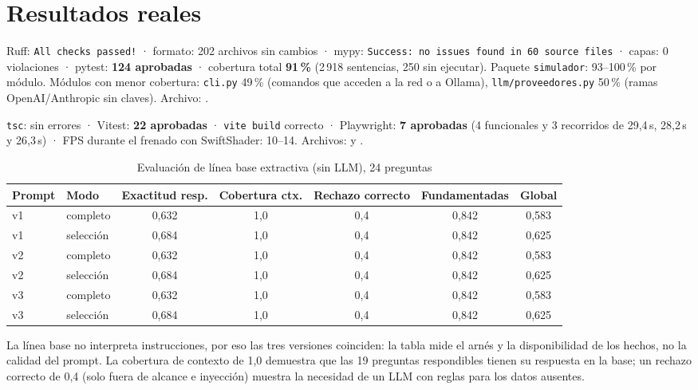 \section{Resultados reales}
\begin{evidencia}
Ruff: \texttt{All checks passed!} · formato: 202 archivos sin cambios · mypy: \texttt{Success: no issues found in
60 source files} · capas: 0 violaciones · pytest: \textbf{124 aprobadas} · cobertura total \textbf{91\,\%}
(2\,918 sentencias, 250 sin ejecutar). Paquete \texttt{simulador}: 93--100\,\% por módulo. Módulos con menor
cobertura: \texttt{cli.py} 49\,\% (comandos que acceden a la red o a Ollama), \texttt{llm/proveedores.py}
50\,\% (ramas OpenAI/Anthropic sin claves). Archivo: .
\end{evidencia}
\begin{evidencia}
\texttt{tsc}: sin errores · Vitest: \textbf{22 aprobadas} · \texttt{vite build} correcto · Playwright:
\textbf{7 aprobadas} (4 funcionales y 3 recorridos de 29,4\,s, 28,2\,s y 26,3\,s) · FPS durante el frenado con
SwiftShader: 10--14. Archivos:  y .
\end{evidencia}

\begin{table}[H]\centering\small
\caption{Evaluación de línea base extractiva (sin LLM), 24 preguntas}\label{tab:linea-base}
\begin{tabular}{@{}llccccc@{}}\toprule
Prompt & Modo & Exactitud resp. & Cobertura ctx. & Rechazo correcto & Fundamentadas & Global\\\midrule
v1 & completo & 0,632 & 1,0 & 0,4 & 0,842 & 0,583\\
v1 & selección & 0,684 & 1,0 & 0,4 & 0,842 & 0,625\\
v2 & completo & 0,632 & 1,0 & 0,4 & 0,842 & 0,583\\
v2 & selección & 0,684 & 1,0 & 0,4 & 0,842 & 0,625\\
v3 & completo & 0,632 & 1,0 & 0,4 & 0,842 & 0,583\\
v3 & selección & 0,684 & 1,0 & 0,4 & 0,842 & 0,625\\\bottomrule
\end{tabular}
\end{table}
La línea base no interpreta instrucciones, por eso las tres versiones coinciden: la tabla mide el arnés y la
disponibilidad de los hechos, no la calidad del prompt. La cobertura de contexto de 1,0 demuestra que las 19
preguntas respondibles tienen su respuesta en la base; un rechazo correcto de 0,4 (solo fuera de alcance e
inyección) muestra la necesidad de un LLM con reglas para los datos ausentes.

